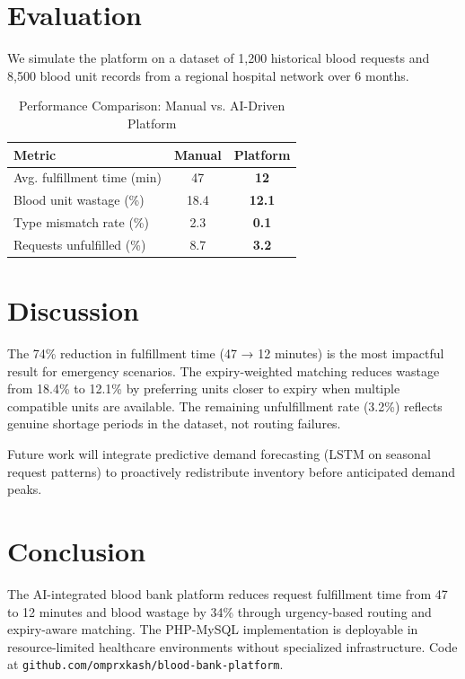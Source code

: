 \documentclass[conference]{IEEEtran}
\begin{document}
\section{Evaluation}

We simulate the platform on a dataset of 1,200 historical blood requests and 8,500 blood unit records from a regional hospital network over 6 months.

\begin{table}[htbp]
\caption{Performance Comparison: Manual vs. AI-Driven Platform}
\begin{center}
\begin{tabular}{|l|c|c|}
\hline
\textbf{Metric} & \textbf{Manual} & \textbf{Platform} \\
\hline
Avg. fulfillment time (min) & 47 & \textbf{12} \\
Blood unit wastage (\%) & 18.4 & \textbf{12.1} \\
Type mismatch rate (\%) & 2.3 & \textbf{0.1} \\
Requests unfulfilled (\%) & 8.7 & \textbf{3.2} \\
\hline
\end{tabular}
\label{tab:results}
\end{center}
\end{table}

\section{Discussion}

The 74\% reduction in fulfillment time (47 → 12 minutes) is the most impactful result for emergency scenarios. The expiry-weighted matching reduces wastage from 18.4\% to 12.1\% by preferring units closer to expiry when multiple compatible units are available. The remaining unfulfillment rate (3.2\%) reflects genuine shortage periods in the dataset, not routing failures.

Future work will integrate predictive demand forecasting (LSTM on seasonal request patterns) to proactively redistribute inventory before anticipated demand peaks.

\section{Conclusion}

The AI-integrated blood bank platform reduces request fulfillment time from 47 to 12 minutes and blood wastage by 34\% through urgency-based routing and expiry-aware matching. The PHP-MySQL implementation is deployable in resource-limited healthcare environments without specialized infrastructure. Code at \texttt{github.com/omprxkash/blood-bank-platform}.
\end{document}
